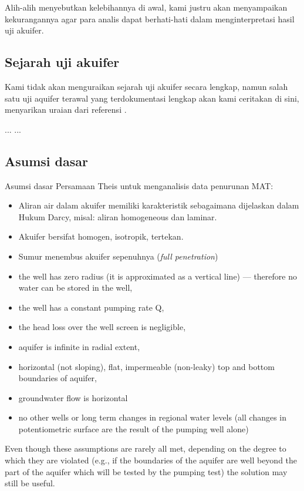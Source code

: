 Alih-alih menyebutkan kelebihannya di awal, kami justru akan menyampaikan kekurangannya agar para analis dapat berhati-hati dalam menginterpretasi hasil uji akuifer.



\subsection{Sejarah uji akuifer}

Kami tidak akan menguraikan sejarah uji akuifer secara lengkap, namun salah satu uji aquifer terawal yang terdokumentasi lengkap akan kami ceritakan di sini, menyarikan uraian dari referensi \cite{kruseman1994analysis}.

...
...




\subsection{Asumsi dasar}

Asumsi dasar Persamaan Theis untuk menganalisis data penurunan MAT:

\begin{itemize}
\item Aliran air dalam akuifer memiliki karakteristik sebagaimana dijelaskan dalam Hukum Darcy, misal: aliran homogeneous dan laminar. 
\item Akuifer bersifat homogen, isotropik, tertekan. 
\item Sumur menembus akuifer sepenuhnya (\textit{full penetration}) 
\item the well has zero radius (it is approximated as a vertical line) — therefore no water can be stored in the well,
\end{itemize}
\begin{itemize}
\item the well has a constant pumping rate Q,
\end{itemize}
\begin{itemize}
\item the head loss over the well screen is negligible,
\end{itemize}
\begin{itemize}
\item aquifer is infinite in radial extent,
\end{itemize}
\begin{itemize}
\item horizontal (not sloping), flat, impermeable (non-leaky) top and bottom boundaries of aquifer,
\end{itemize}
\begin{itemize}
\item groundwater flow is horizontal
\end{itemize}
\begin{itemize}
\item no other wells or long term changes in regional water levels (all changes in potentiometric surface are the result of the pumping well alone)
\end{itemize}
\begin{itemize}
\end{itemize}

Even though these assumptions are rarely all met, depending on the degree to which they are violated (e.g., if the boundaries of the aquifer are well beyond the part of the aquifer which will be tested by the pumping test) the solution may still be useful.

